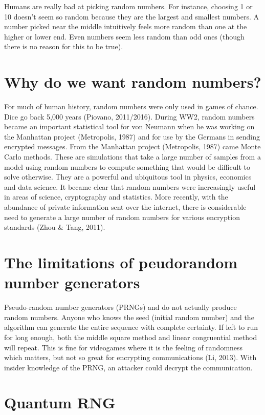 \documentclass{book}
\begin{document}
Humans are really bad at picking random numbers. For instance, choosing 1 or 10 doesn’t seem so random because they are the largest and smallest numbers. A number picked near the middle intuitively feels more random than one at the higher or lower end. Even numbers seem less random than odd ones (though there is no reason for this to be true). 


\section{Why do we want random numbers?}

For much of human history, random numbers were only used in games of chance. Dice go back 5,000 years (Piovano, 2011/2016). During WW2, random numbers became an important statistical tool for von Neumann when he was working on the Manhattan project (Metropolis, 1987) and for use by the Germans in sending encrypted messages. 
From the Manhattan project (Metropolis, 1987) came Monte Carlo methods. These are simulations that take a large number of samples from a model using random numbers to compute something that would be difficult to solve otherwise. They are a powerful and ubiquitous tool in physics, economics and data science. It became clear that random numbers were increasingly useful in areas of science, cryptography and statistics. More recently, with the abundance of private information sent over the internet, there is considerable need to generate a large number of random numbers for various encryption standards (Zhou \& Tang, 2011).

\section{The limitations of peudorandom number generators} 


Pseudo-random number generators (PRNGs) and do not actually produce random numbers. Anyone who knows the seed (initial random number) and the algorithm can generate the entire sequence with complete certainty. If left to run for long enough, both the middle square method and linear congruential method will repeat. This is fine for videogames where it is the feeling of randomness which matters, but not so great for encrypting communications (Li, 2013). With insider knowledge of the PRNG, an attacker could decrypt the communication.

\section{Quantum RNG}
\end{document}
